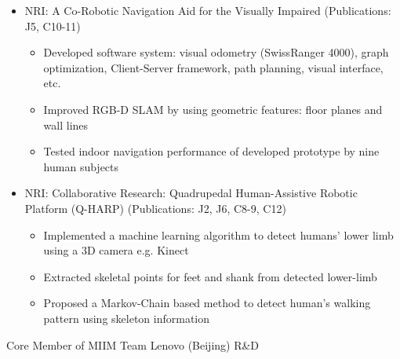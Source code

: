 \begin{cventries}
{\begin{justify}
\begin{itemize}[leftmargin=2ex, nosep, noitemsep]
 		\setlength{\parskip}{0pt}
 		\renewcommand{\labelitemi}{\bullet}
 		\item {NRI: A Co-Robotic Navigation Aid for the Visually Impaired (Publications: J5, C10-11)}
 		\begin{itemize}[leftmargin=3ex]
 			\scriptsize
 			\item {Developed software system: visual odometry (SwissRanger 4000), graph optimization, Client-Server framework, path planning, visual interface, etc.}
 			\item {Improved RGB-D SLAM by using geometric features: floor planes and wall lines}
 			\item {Tested indoor navigation performance of developed prototype by nine human subjects}
 		\end{itemize}
 		\item {NRI: Collaborative Research: Quadrupedal Human-Assistive Robotic Platform (Q-HARP) (Publications: J2, J6, C8-9, C12)}
 		\begin{itemize}[leftmargin=3ex]
 			\scriptsize
 			\item {Implemented a machine learning algorithm to detect humans' lower limb using a 3D camera e.g. Kinect}
 			\item {Extracted skeletal points for feet and shank from detected lower-limb}
 			\item {Proposed a Markov-Chain based method to detect human’s walking pattern using skeleton information}
 		\end{itemize}
 	\end{itemize}
 \end{justify}
 \vspace{-2.0mm}  
    }
	   \cventry
		{Core Member of MIIM Team} %
		{Lenovo (Beijing) R\&D} %

\end{cventries}
